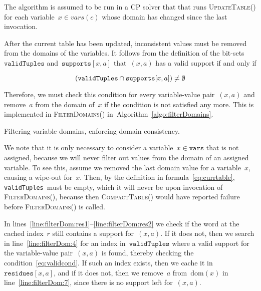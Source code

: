 \documentclass[a4paper,11pt]{article}
\newcommand{\Algoref}[1]{Algorithm~\ref{#1}}
\newcommand{\Lineref}[1]{Line~\ref{#1}}
\newcommand{\linesref}[2]{lines~\ref{#1}--\ref{#2}}
\newcommand{\Dom}[1]{\text{dom}({#1})}
\newcommand{\CurrTable}{\texttt{validTuples}}
\newcommand{\Supports}{\texttt{supports}}
\newcommand{\Residues}{\texttt{residues}}
\newcommand{\Vars}{\texttt{vars}}
\def\CompactTable{\textsc{CompactTable}}
\def\UpdateTable{\textsc{UpdateTable}}
\def\FilterDomains{\textsc{FilterDomains}}
\numberwithin{equation}{section}
\begin{document}
  The algorithm is assumed to be run in a CP solver that that runs \UpdateTable()
  for each variable~$x \in \mathit{vars}(c)$ whose domain has changed since the
  last invocation.
  
  \bigskip

  After the current table has been updated, inconsistent values must be removed
  from the domains of the variables.   
  It follows from the definition of the bit-sets~$\CurrTable$ and~$\Supports[x,a]$
  that~$(x,a)$ has a valid support if and only if 

  \begin{equation}
    \label{eq:validcond}
    (\CurrTable \Inter \Supports[x,a]) \neq \emptyset
  \end{equation}

  Therefore, we must check this condition for every variable-value pair~$(x,a)$ and
  remove~$a$ from the domain of~$x$ if the condition is not satisfied any more.
  This is implemented in \FilterDomains()
  in~\Algoref{algo:filterDomains}.%

  \begin{algorithm}[t]
    \begin{algorithmic}[1]  %
      
    \end{algorithmic}
    \caption{Filtering variable domains, enforcing domain consistency.}
        \label{algo:filterDomains}
  \end{algorithm}

  
  We note that it is only necessary to
  consider a variable~$x \in \Vars$ that is not assigned,
  because we will never filter out values from the domain of an assigned variable.
  To see this, assume we removed the last domain value for a variable~$x$,
  causing a wipe-out for~$x$. Then, by the definition in formula~\eqref{eq:currtable},
  \CurrTable~must be empty,
  which it will never be upon invocation of \FilterDomains(), because then
  \CompactTable() would have reported failure before \FilterDomains() is called. 

  In \linesref{line:filterDom:res1}{line:filterDom:res2} we check if the
  word at the cached index~$\mathit{r}$ still contains a support for~$(x,a)$. 
  If it does not, then we search in line~\ref{line:filterDom:4} for 
  an index in~$\CurrTable$ where a valid support for the variable-value
  pair~$(x,a)$ is found, thereby checking the condition~\eqref{eq:validcond}.
  If such an index exists, then we cache it in~$\Residues[x,a]$, and
  if it does not, then we remove~$a$ from~$\Dom{x}$ in
  line~\ref{line:filterDom:7}, since there is no support left for~$(x,a)$.
\end{document}
